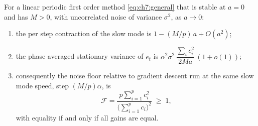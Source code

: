 \begin{theorem}\label{thm:ch7:gainweight}
For a linear periodic first order method \eqref{eq:ch7:general} that is stable at $a=0$ and has $M>0$, with
uncorrelated noise of variance $\sigma^2$, as $a\to0$:
\begin{enumerate}[label=(\roman*),leftmargin=2em]
\item the per step contraction of the slow mode is $1-(M/p)\,a+O(a^2)$;
\item the phase averaged stationary variance of $e_t$ is
  $\alpha^2\sigma^2\,\dfrac{\sum_ic_i^2}{2Ma}\,(1+o(1))$;
\item consequently the noise floor relative to gradient descent run at the same
  slow mode speed, step $(M/p)\alpha$, is
  \begin{equation}\label{eq:ch7:F}
    \mathcal F=\frac{p\sum_{i=1}^pc_i^2}{\bigl(\sum_{i=1}^pc_i\bigr)^2}\;\geq\;1,
  \end{equation}
  with equality if and only if all gains are equal.
\end{enumerate}
\end{theorem}


